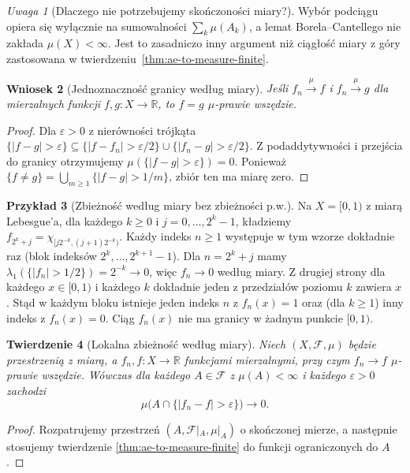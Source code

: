 \documentclass[11pt,a4paper,oneside]{book}
\numberwithin{equation}{chapter}
\theoremstyle{plain}
\newtheorem{twierdzenie}{Twierdzenie}[chapter]
\newtheorem{wniosek}[twierdzenie]{Wniosek}
\theoremstyle{definition}
\newtheorem{przyklad}[twierdzenie]{Przykład}
\theoremstyle{remark}
\newtheorem{uwaga}[twierdzenie]{Uwaga}
\begin{document}
\begin{uwaga}[Dlaczego nie potrzebujemy skończoności miary?]
Wybór podciągu opiera się wyłącznie na sumowalności
$\sum_k\mu(A_k)$, a lemat Borela--Cantellego nie
zakłada $\mu(X)<\infty$. Jest to zasadniczo inny
argument niż ciągłość miary z góry zastosowana w
twierdzeniu~\ref{thm:ae-to-measure-finite}.
\end{uwaga}

\begin{wniosek}[Jednoznaczność granicy według miary]
\label{cor:measure-limit-unique}
Jeśli $f_n\xrightarrow{\mu}f$ i
$f_n\xrightarrow{\mu}g$ dla mierzalnych funkcji
$f,g:X\to\mathbb R$, to $f=g$ $\mu$-prawie wszędzie.
\end{wniosek}
\begin{proof}
Dla $\varepsilon>0$ z nierówności trójkąta
$\{|f-g|>\varepsilon\}\subseteq
\{|f-f_n|>\varepsilon/2\}\cup
\{|f_n-g|>\varepsilon/2\}$.
Z podaddytywności i przejścia do granicy
otrzymujemy $\mu(\{|f-g|>\varepsilon\})=0$.
Ponieważ $\{f\ne g\}=\bigcup_{m\ge1}\{|f-g|>1/m\}$,
zbiór ten ma miarę zero.
\end{proof}

\begin{przyklad}[Zbieżność według miary bez zbieżności p.w.]
\label{ex:typewriter}
Na $X=[0,1)$ z miarą Lebesgue'a, dla każdego $k\ge0$
i $j=0,\ldots,2^k-1$, kładziemy
$f_{2^k+j}=\chi_{[j2^{-k},(j+1)2^{-k})}$.
Każdy indeks $n\ge1$ występuje w tym wzorze dokładnie
raz (blok indeksów $2^k,\ldots,2^{k+1}-1$).
Dla $n=2^k+j$ mamy
$\lambda_1(\{|f_n|>1/2\})=2^{-k}\to0$,
więc $f_n\to0$ według miary.
Z drugiej strony dla każdego $x\in[0,1)$ i każdego
$k$ dokładnie jeden z przedziałów poziomu $k$
zawiera $x$. Stąd w każdym bloku istnieje jeden indeks
$n$ z $f_n(x)=1$ oraz (dla $k\ge1$) inny indeks
z $f_n(x)=0$. Ciąg $f_n(x)$ nie ma granicy w żadnym
punkcie $[0,1)$.
\end{przyklad}

\begin{twierdzenie}[Lokalna zbieżność według miary]
\label{thm:local-convergence-measure}
Niech $(X,\mathcal F,\mu)$ będzie przestrzenią z miarą,
a $f_n,f:X\to\mathbb R$ funkcjami mierzalnymi,
przy czym $f_n\to f$ $\mu$-prawie wszędzie.
Wówczas dla każdego $A\in\mathcal F$ z $\mu(A)<\infty$
i każdego $\varepsilon>0$ zachodzi
\[
\mu\bigl(A\cap\{|f_n-f|>\varepsilon\}\bigr)\longrightarrow0.
\]
\end{twierdzenie}
\begin{proof}
Rozpatrujemy przestrzeń
$(A,\mathcal F|_A,\mu|_A)$ o skończonej mierze,
a następnie stosujemy twierdzenie
\ref{thm:ae-to-measure-finite} do funkcji ograniczonych
do $A$.
\end{proof}
\end{document}
